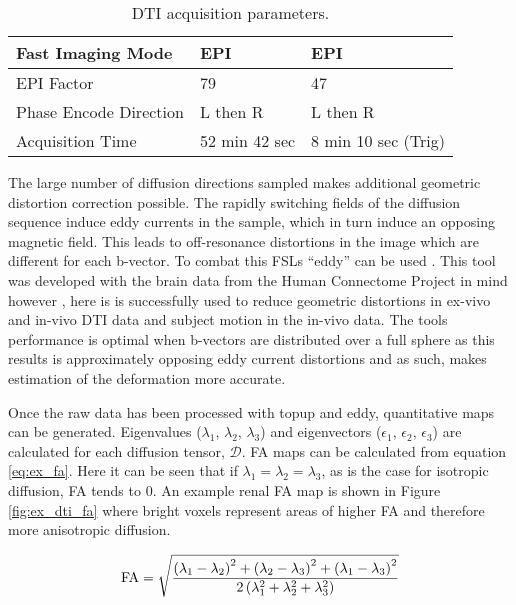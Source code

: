 \begin{table}[H]
\begin{tabularx}{1.0\textwidth}{|X|X|X|}
		Fast Imaging Mode                  & EPI             & EPI                 \\ \hline
		EPI Factor                         & 79              & 47                  \\ \hline
		Phase Encode Direction             & L then R        & L then R            \\ \hline
		Acquisition Time                   & 52 min 42 sec   & 8 min 10 sec (Trig) \\ \hline
	\end{tabularx}
	\caption{\ac{DTI} acquisition parameters.}
	\label{tab:ex_dti_mapping}
\end{table}

The large number of diffusion directions sampled makes additional geometric distortion correction possible. The rapidly switching fields of the diffusion sequence induce eddy currents in the sample, which in turn induce an opposing magnetic field. This leads to off-resonance distortions in the image which are different for each b-vector. To combat this \ac{FSL}s ``eddy'' can be used \cite{andersson_integrated_2016}. This tool was developed with the brain data from the Human Connectome Project in mind however \cite{andersson_non-parametric_2015}, here is is successfully used to reduce geometric distortions in ex-vivo and in-vivo \ac{DTI} data and subject motion in the in-vivo data. The tools performance is optimal when b-vectors are distributed over a full sphere as this results is approximately opposing eddy current distortions and as such, makes estimation of the deformation more accurate.

Once the raw data has been processed with topup and eddy, quantitative maps can be generated. Eigenvalues ($\lambda_1$, $\lambda_2$, $\lambda_3$) and eigenvectors ($\epsilon_1$, $\epsilon_2$, $\epsilon_3$) are calculated for each diffusion tensor, $\mathscr{D}$. \ac{FA} maps can be calculated from equation \eqref{eq:ex_fa}. Here it can be seen that if $\lambda_1 = \lambda_2 = \lambda_3$, as is the case for isotropic diffusion, \ac{FA} tends to 0. An example renal \ac{FA} map is shown in Figure \ref{fig:ex_dti_fa} where bright voxels represent areas of higher \ac{FA} and therefore more anisotropic diffusion.

\begin{equation}
	\textup{FA} = \sqrt{\frac{\left(\lambda_1 - \lambda_2\right)^2 + \left(\lambda_2 - \lambda_3\right)^2 + \left(\lambda_1 - \lambda_3\right)^2}{2\left( \lambda_1^2 + \lambda_2^2 + \lambda_3^2\right)}}
		\label{eq:ex_fa}
\end{equation}

